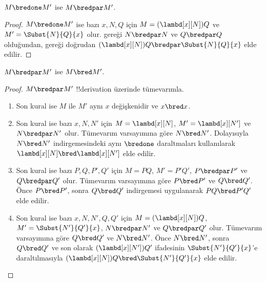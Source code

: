 



\begin{lem}
  $M \bredone M'$ ise $M \bredpar M'$.
\end{lem}
\begin{proof} $M \bredone M'$ ise bazı $x,N,Q$ için
    $M=(\lambd[x][N])Q$ ve $M'=\Subst{N}{Q}{x}$ olur.
     gereği $N\bredpar N$ ve $Q\bredpar Q$ olduğundan,
     gereği doğrudan
    $(\lambd[x][N])Q\bredpar\Subst{N}{Q}{x}$ elde edilir.
\end{proof}

\begin{lem}
  $M \bredpar M'$ ise $M \bred M'$.
\end{lem}

\begin{proof} $M \bredpar M'$ !!{derivation} üzerinde tümevarımla.
  \begin{enumerate}
  \item Son kural  ise $M$ ile $M'$ aynı $x$
    değişkenidir ve $x\bred x$.
  \item Son kural  ise bazı $x,N,N'$ için
    $M=\lambd[x][N]$, $M'=\lambd[x][N']$ ve $N\bredpar N'$ olur.
    Tümevarım varsayımına göre $N\bred N'$. Dolayısıyla $N\bred N'$
    indirgemesindeki aynı $\bredone$ daraltmaları kullanılarak
    $\lambd[x][N]\bred\lambd[x][N']$ elde edilir.
  \item Son kural  ise bazı $P,Q,P',Q'$ için
    $M=PQ$, $M'=P'Q'$, $P\bredpar P'$ ve $Q\bredpar Q'$ olur. Tümevarım
    varsayımına göre $P\bred P'$ ve $Q\bred Q'$. Önce $P\bred P'$, sonra
    $Q\bred Q'$ indirgemesi uygulanarak $PQ\bred P'Q'$ elde edilir.
  \item Son kural  ise bazı $x,N,N',Q,Q'$ için
    $M=(\lambd[x][N])Q$, $M'=\Subst{N'}{Q'}{x}$,
    $N\bredpar N'$ ve $Q\bredpar Q'$ olur. Tümevarım varsayımına göre
    $Q\bred Q'$ ve $N\bred N'$. Önce $N\bred N'$, sonra $Q\bred Q'$ ve
    son olarak $(\lambd[x][N'])Q'$ ifadesinin
    $\Subst{N'}{Q'}{x}$'e daraltılmasıyla
    $(\lambd[x][N])Q\bred\Subst{N'}{Q'}{x}$ elde edilir.
  \end{enumerate}
\end{proof}

